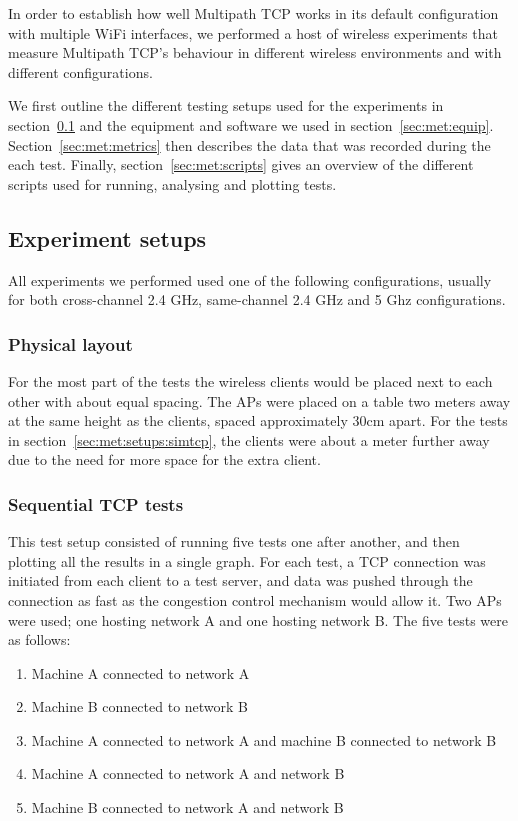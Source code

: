 In order to establish how well Multipath TCP works in its default configuration
with multiple WiFi interfaces, we performed a host of wireless experiments that
measure Multipath TCP's behaviour in different wireless environments and with
different configurations.

We first outline the different testing setups used for the experiments in
section~\ref{sec:met:setups} and the equipment and software we used in
section~\ref{sec:met:equip}. Section~\ref{sec:met:metrics} then describes the
data that was recorded during the each test. Finally,
section~\ref{sec:met:scripts} gives an overview of the different scripts used
for running, analysing and plotting tests.

\subsection{Experiment setups}
\label{sec:met:setups}
All experiments we performed used one of the following configurations, usually
for both cross-channel 2.4 GHz, same-channel 2.4 GHz and 5 Ghz configurations.

\subsubsection{Physical layout}
For the most part of the tests the wireless clients would be placed next to each
other with about equal spacing. The APs were placed on a table two meters away
at the same height as the clients, spaced approximately 30cm apart. For the
tests in section~\ref{sec:met:setups:simtcp}, the clients were about a meter
further away due to the need for more space for the extra client.

\subsubsection{Sequential TCP tests}
\label{sec:met:setups:seqtcp}
This test setup consisted of running five tests one after another, and then
plotting all the results in a single graph. For each test, a TCP connection was
initiated from each client to a test server, and data was pushed through the
connection as fast as the congestion control mechanism would allow it. Two APs
were used; one hosting network A and one hosting network B. The five tests were
as follows:

\begin{enumerate}
  \item Machine A connected to network A
  \item Machine B connected to network B
  \item Machine A connected to network A and machine B connected to network B
  \item Machine A connected to network A and network B
  \item Machine B connected to network A and network B
\end{enumerate}

